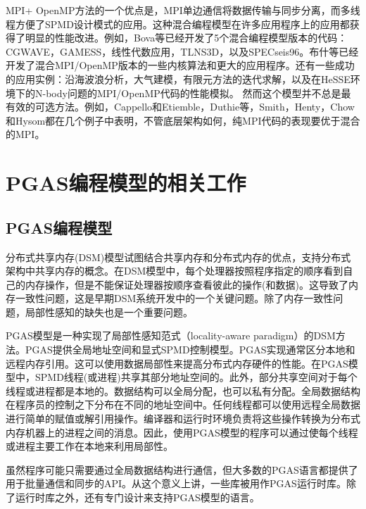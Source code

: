 MPI+ OpenMP方法的一个优点是，MPI单边通信将数据传输与同步分离，而多线程方便了SPMD设计模式的应用。这种混合编程模型在许多应用程序上的应用都获得了明显的性能改进。例如，Bova等已经开发了5个混合编程模型版本的代码\citep{bova1999combining}：CGWAVE，GAMESS，线性代数应用，TLNS3D，以及SPECseis96。布什等\citep{bush2000mixed}已经开发了混合MPI/OpenMP版本的一些内核算法和更大的应用程序。还有一些成功的应用实例：沿海波浪分析\citep{luong2001coastal}，大气建模\citep{loft2001terascale}，有限元方法的迭代求解\citep{nakajima2005parallel}，以及在HeSSE环境下的N-body问题的MPI/OpenMP代码的性能模拟\citep{aversa2005performance}。  
然而这个模型并不总是最有效的可选方法。例如，Cappello和Etiemble\citep{cappello2000mpi}，Duthie等\citep{duthie2004mixed}，Smith\citep{smith2000mixed}，Henty\citep{henty2000performance}，Chow和Hysom\citep{chow2001assessing}都在几个例子中表明，不管底层架构如何，纯MPI代码的表现要优于混合的MPI。

\section{PGAS编程模型的相关工作}

\subsection{PGAS编程模型}

分布式共享内存(DSM)模型试图结合共享内存和分布式内存的优点，支持分布式架构中共享内存的概念\citep{protic1995survey}。在DSM模型中，每个处理器按照程序指定的顺序看到自己的内存操作，但是不能保证处理器按顺序查看彼此的操作(和数据)。这导致了内存一致性问题，这是早期DSM系统开发中的一个关键问题。除了内存一致性问题，局部性感知的缺失也是一个重要问题。

PGAS模型是一种实现了局部性感知范式（locality-aware paradigm）\citep{coarfa2005evaluation}的DSM方法。PGAS提供全局地址空间和显式SPMD控制模型。PGAS实现通常区分本地和远程内存引用。这可以使用数据局部性来提高分布式内存硬件的性能\citep{saraswat2010asynchronous}。在PGAS模型中，SPMD线程(或进程)共享其部分地址空间的。此外，部分共享空间对于每个线程或进程都是本地的。数据结构可以全局分配，也可以私有分配。全局数据结构在程序员的控制之下分布在不同的地址空间中。任何线程都可以使用远程全局数据进行简单的赋值或解引用操作。编译器和运行时环境负责将这些操作转换为分布式内存机器上的进程之间的消息。因此，使用PGAS模型的程序可以通过使每个线程或进程主要工作在本地来利用局部性。 
 
虽然程序可能只需要通过全局数据结构进行通信，但大多数的PGAS语言都提供了用于批量通信和同步的API。从这个意义上讲，一些库被用作PGAS运行时库。除了运行时库之外，还有专门设计来支持PGAS模型的语言。

